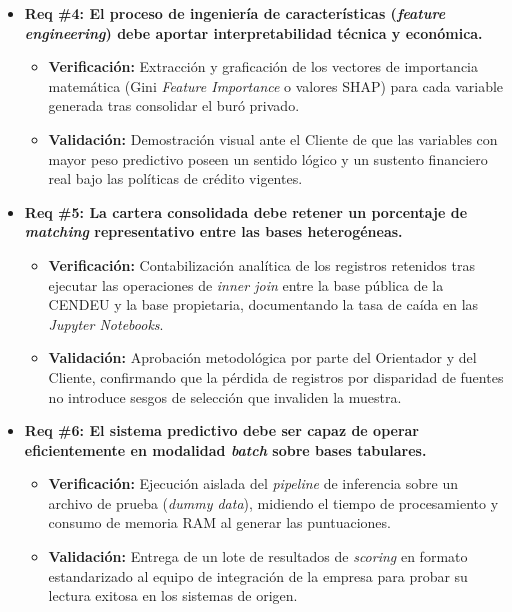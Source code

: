 \documentclass[
11pt, %
]{charter}
\begin{document}
\begin{itemize}
    \item \textbf{Req \#4: El proceso de ingeniería de características (\textit{feature engineering}) debe aportar interpretabilidad técnica y económica.}
    \begin{itemize}
        \item \textbf{Verificación:} Extracción y graficación de los vectores de importancia matemática (Gini \textit{Feature Importance} o valores SHAP) para cada variable generada tras consolidar el buró privado.
        \item \textbf{Validación:} Demostración visual ante el Cliente de que las variables con mayor peso predictivo poseen un sentido lógico y un sustento financiero real bajo las políticas de crédito vigentes.
    \end{itemize}

    \item \textbf{Req \#5: La cartera consolidada debe retener un porcentaje de \textit{matching} representativo entre las bases heterogéneas.}
    \begin{itemize}
        \item \textbf{Verificación:} Contabilización analítica de los registros retenidos tras ejecutar las operaciones de \textit{inner join} entre la base pública de la CENDEU y la base propietaria, documentando la tasa de caída en las \textit{Jupyter Notebooks}.
        \item \textbf{Validación:} Aprobación metodológica por parte del Orientador y del Cliente, confirmando que la pérdida de registros por disparidad de fuentes no introduce sesgos de selección que invaliden la muestra.
    \end{itemize}

    \item \textbf{Req \#6: El sistema predictivo debe ser capaz de operar eficientemente en modalidad \textit{batch} sobre bases tabulares.}
    \begin{itemize}
        \item \textbf{Verificación:} Ejecución aislada del \textit{pipeline} de inferencia sobre un archivo de prueba (\textit{dummy data}), midiendo el tiempo de procesamiento y consumo de memoria RAM al generar las puntuaciones.
        \item \textbf{Validación:} Entrega de un lote de resultados de \textit{scoring} en formato estandarizado al equipo de integración de la empresa para probar su lectura exitosa en los sistemas de origen.
    \end{itemize}


\end{itemize}
\end{document}

